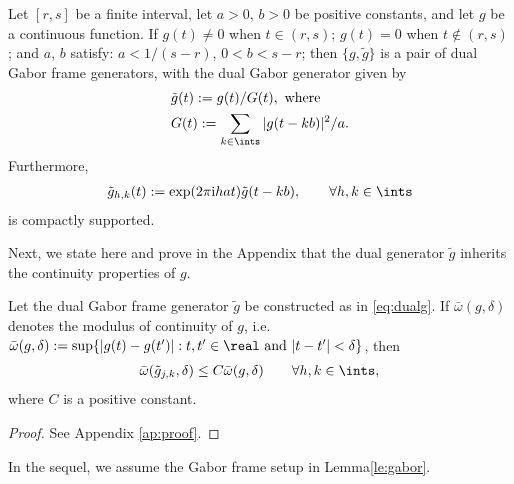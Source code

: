 \documentclass[a4paper, 12pt]{article}
\renewcommand{\i}{\mathrm{i}}
\newcommand{\sumi}{\ensuremath{\sum_{k \in \ints}}\xspace}
\newcommand{\tg}{\ensuremath{\tilde{g}}\xspace}
\newcommand{\hkints}{\ensuremath{h,k \in \ints}\xspace}
\newcommand{\modc}[2]{\ensuremath{{\bar{\omega}}({#1},#2)}\xspace}
\begin{document}
\begin{lem}\label{le:gabor}
  Let $[r,s]$ be a finite interval,  let $a> 0$, $b > 0$  be positive constants,  and let $g$ be a continuous function. If $g(t) \ne 0$ when $t \in (r,s)$; $g(t) = 0$ when $t \notin (r,s)$;  and  $a$, $b$ satisfy: $a < 1/(s-r)$, $0<b<s-r$; then  $\{g,\tilde{g}\}$ is a pair of dual Gabor frame generators, with the dual Gabor generator given by  
\begin{align}
  &\tilde{g}(t)  :=  g(t)/G(t), \text{ where} \label{eq:dualg}\\
  &G(t) := \sumi|g(t-kb)|^2/a.\label{eq:capg}
\end{align}
Furthermore, 
\begin{align}
  \tilde{g}_{h,k}(t) := \exp({2\pi\i h a t}) \tilde{g}(t - kb), \qquad \forall h, k \in \ints \label{eq:dualghk}
\end{align}
is compactly supported.   
\end{lem}
\noindent Next, we state here and prove in the Appendix that the dual generator \tg  inherits the continuity properties of $g$.
\begin{lem} \label{lem:modtg}
  Let the dual Gabor frame generator $\tilde{g}$ be constructed as in \eqref{eq:dualg}. If $\modc{g}{\delta}$ denotes the modulus of continuity of $g$, i.e. $\modc{g}{\delta} := \sup \{|g(t) - g(t')| : t,t' \in \real \text{ and } |t -t'| < \delta\}$,  then   
  \begin{align}
    \modc{\tilde{g}_{j,k}}{\delta} \le C \modc{g}{\delta} \qquad \forall \hkints\notag,
    \label{}
  \end{align}
  where $C$ is a positive constant.
\end{lem}
\begin{proof}
  See Appendix \ref{ap:proof}.
\end{proof}
\noindent In the sequel,  we assume the Gabor frame setup in Lemma\ref{le:gabor}.
\end{document}
